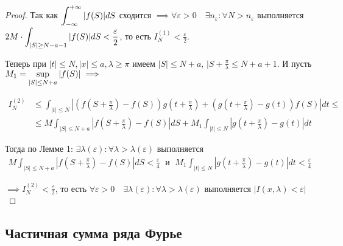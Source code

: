 \begin{proof}
    Так как $\displaystyle\int_{-\infty}^{+\infty} |f(S)| dS$ сходится $\implies
    \forall \varepsilon > 0 \quad \exists n_\varepsilon : \forall N > 
    n_\varepsilon$ выполняется $2 M \cdot \displaystyle\int_{|S| \geq N - a - 1} |f(S)| dS < \frac{\varepsilon}{2}$,
    то есть $I_N^{(1)} < \frac{\varepsilon}{2}$.

    Теперь при $|t| \leq N, |x| \leq a, \lambda \geq \pi$ имеем $|S| \leq N + a, \,
    |S + \frac{\pi}{\lambda} \leq N + a + 1$. И пусть $M_1 = \displaystyle\sup_{|S| \leq N + a} |f(S)| \implies$

    \begin{align*}
        I_N^{(2)} &\leq \int_{|t| \leq N} 
        \left| \left( f\left( S + \frac{\pi}{\lambda} \right) - f(S) \right)
               g \left( t + \frac{\pi}{\lambda} \right) +
               \left( g\left( t + \frac{\pi}{\lambda} \right) - g(t) \right)
               f(S) \right| dt \leq \\
        &\leq M \int_{|S| \leq N + a} \left| 
            f \left( S + \frac{\pi}{\lambda} \right) - f(S) \right| dS +
        M_1 \int_{|t| \leq N} \left| 
            g \left( t + \frac{\pi}{\lambda} \right) - g(t) \right| dt
    \end{align*}

    Тогда по Лемме 1: $\exists \lambda(\varepsilon) : \forall \lambda > 
    \lambda(\varepsilon)$ выполняется 
    \begin{align*}
        M \int_{|S| \leq N + a} \left| 
        f \left( S + \frac{\pi}{\lambda} \right) - f(S) \right| dS < \frac{\varepsilon}{4} \; \text{ и } \;
        M_1 \int_{|t| \leq N} \left| 
        g \left( t + \frac{\pi}{\lambda} \right) - g(t) \right| dt < \frac{\varepsilon}{4}
    \end{align*}

    $\implies I_N^{(2)} < \frac{\varepsilon}{2}$, то есть $\forall \varepsilon > 0 \quad
    \exists \lambda(\varepsilon) : \forall \lambda > \lambda(\varepsilon)$ 
    выполняется $|I(x, \lambda) < \varepsilon|$
\end{proof}


\subsection{Частичная сумма ряда Фурье}

